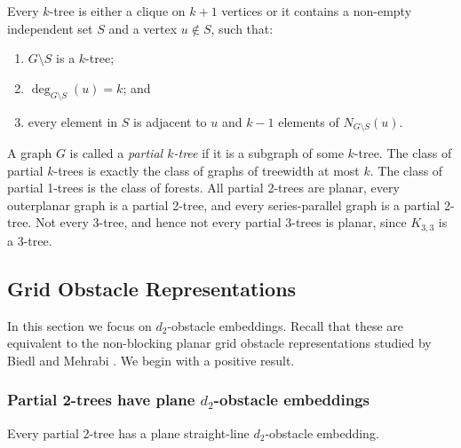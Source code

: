 \documentclass{patmorin}
\begin{document}
\begin{lem}
   Every $k$-tree is either a clique on $k+1$ vertices or it contains a non-empty independent set $S$ and a vertex $u\not\in S$, such that:
\begin{enumerate}
   \item $G\setminus S$ is a $k$-tree;
   \item $\deg_{G\setminus S}(u)=k$; and 
   \item every element in $S$ is adjacent to $u$ and $k-1$ elements of
   $N_{G\setminus S}(u)$.
\end{enumerate}
\end{lem}

A graph $G$ is called a \emph{partial $k$-tree} if it is a subgraph of
some $k$-tree.  The class of partial $k$-trees is exactly the class of
graphs of treewidth at most $k$.  The class of partial 1-trees is the
class of forests.  All partial 2-trees are planar, every outerplanar graph
is a partial 2-tree, and every series-parallel graph is a partial 2-tree.
Not every 3-tree, and hence not every partial 3-trees is planar, since
$K_{3,3}$ is a 3-tree.

\subsection{Grid Obstacle Representations}

In this section we focus on $d_2$-obstacle embeddings.  Recall that these
are equivalent to the non-blocking planar grid obstacle representations
studied by Biedl and Mehrabi \cite{X}.  We begin with a positive result.

\subsubsection{Partial 2-trees have plane $d_2$-obstacle embeddings}

\begin{thm}
  Every partial 2-tree has a plane straight-line $d_2$-obstacle embedding.
\end{thm}
\end{document}

